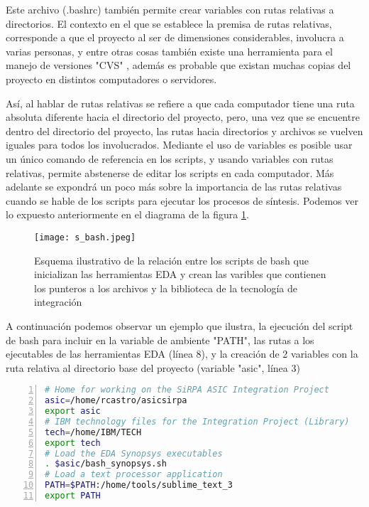 Este archivo (.bashrc) también permite crear variables con rutas relativas a directorios. El contexto en el que se establece la premisa de rutas relativas, corresponde a que el proyecto al ser de dimensiones considerables, involucra a varias personas, y entre otras cosas también existe una herramienta para el manejo de versiones "CVS" \cite{website:cvs}, además es probable que existan muchas copias del proyecto en distintos computadores o servidores.

Así, al hablar de rutas relativas se refiere a que cada computador tiene una ruta absoluta diferente hacia el directorio del proyecto, pero, una vez que se encuentre dentro del directorio del proyecto, las rutas hacia directorios y archivos se vuelven iguales para todos los involucrados. Mediante el uso de variables es posible usar un único comando de referencia en los scripts, y usando variables con rutas relativas, permite abstenerse de editar los scripts en cada computador. Más adelante se expondrá un poco más sobre la importancia de las rutas relativas cuando se hable de los scripts para ejecutar los procesos de síntesis. Podemos ver lo expuesto anteriormente en el diagrama de la figura \ref{bash_syn}.

\begin{figure}[h]
\texttt{[image: s\_bash.jpeg]}
\centering
\caption{Esquema ilustrativo de la relación entre los scripts de bash que inicializan las herramientas EDA y crean las varibles que contienen los punteros a los archivos y la biblioteca de la tecnología de integración}
\label{bash_syn}
\end{figure}

A continuación podemos observar un ejemplo que ilustra, la ejecución del script de bash para incluir en la variable de ambiente "PATH", las rutas a los ejecutables de las herramientas EDA (línea 8), y la creación de 2 variables con la ruta relativa al directorio base del proyecto (variable "asic", línea 3)



\begin{lstlisting}[language=bash, numbers=left, keywordstyle=\color{blue}, commentstyle=\color{mygreen}]
# Home for working on the SiRPA ASIC Integration Project
asic=/home/rcastro/asicsirpa
export asic
# IBM technology files for the Integration Project (Library)
tech=/home/IBM/TECH
export tech
# Load the EDA Synopsys executables
. $asic/bash_synopsys.sh
# Load a text processor application
PATH=$PATH:/home/tools/sublime_text_3
export PATH
\end{lstlisting}


